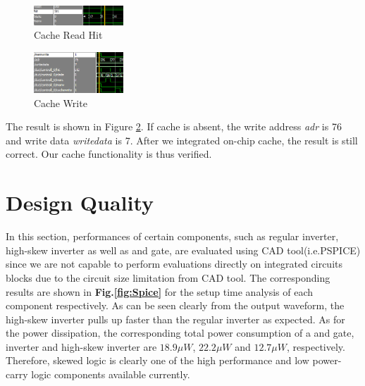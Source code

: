 \documentclass[conference]{IEEEtran}
\begin{document}
\begin{figure}[h!]
  \centering
    \includegraphics[width=0.3\textwidth]{cache_hit.png}
  \caption{Cache Read Hit}
  \label{fig:cache_hit}
\end{figure}

\begin{figure}[h!]
  \centering
    \includegraphics[width=0.3\textwidth]{cache_write.png}
  \caption{Cache Write}
  \label{fig:cache_write}
\end{figure}

The result is shown in Figure \ref{fig:cache_write}. If cache is absent, the write address \textit{adr} is 76 and write data \textit{writedata} is 7. After we integrated on-chip cache, the result is still correct. Our cache functionality is thus verified.

\section{Design Quality}\label{quality}
 
 
 
In this section, performances of certain components, such as regular inverter, high-skew inverter as well as and gate, are evaluated using CAD tool(i.e.PSPICE) since we are not capable to perform evaluations directly on integrated circuits blocks due to the circuit size limitation from CAD tool. The corresponding results are shown in \textbf{Fig.\ref{fig:Spice}} for the setup time analysis of each component respectively. As can be seen clearly from the output waveform, the high-skew inverter pulls up faster than the regular inverter as expected. As for the power dissipation, the corresponding total power consumption of a and gate, inverter and high-skew inverter are $18.9\mu W$, $22.2\mu W$ and $12.7\mu W$, respectively. Therefore, skewed logic is clearly one of the high performance and low power-carry logic components available currently.
\end{document}
